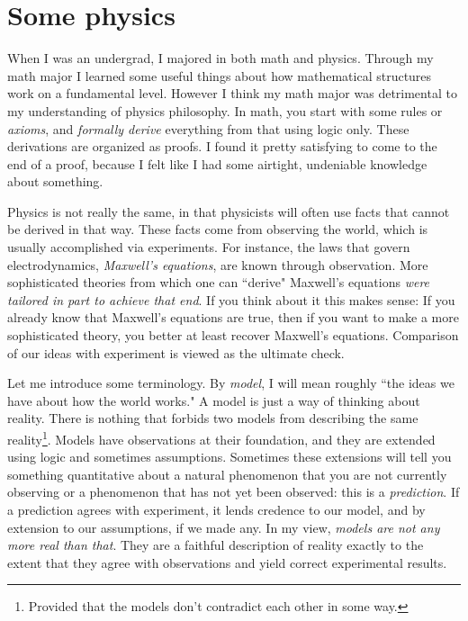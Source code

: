 \chapter{Some physics}\label{ch:physics}



When I was an undergrad, I majored in both math and physics. Through my math
major I learned some useful things about how mathematical structures work on a
fundamental level. However I think my math major was detrimental to my
understanding of physics philosophy. In math, you start with some rules or {\it
axioms}, and {\it formally derive} everything from that using logic only. 
These derivations are organized as proofs. I found it pretty satisfying to 
come to the end of a proof, because I felt like I had some airtight, undeniable 
knowledge about something. 

Physics is not really the same, in that physicists will often 
use facts that cannot be derived in that way. These facts come from
observing the world, which is usually accomplished via experiments.
For instance, the laws that govern electrodynamics, {\it Maxwell's equations},
are known through observation. More sophisticated theories from which one
can ``derive" Maxwell's equations {\it were tailored in part to achieve that
end}. If you think about it this makes sense: If you already know that Maxwell's
equations are true, then if you want to make a more sophisticated theory, you
better at least recover Maxwell's equations. 
Comparison of our ideas with experiment is viewed as the ultimate check.

Let me introduce some terminology. By {\it model}, I will mean roughly ``the
ideas we have about how the world works." A model is just a way of thinking
about reality. There is nothing that forbids two models from describing the same
reality\footnote{Provided that the models don't contradict each other in some
way.}. Models have observations at their foundation, and they are extended using
logic and sometimes assumptions. Sometimes these extensions will tell you
something quantitative about a natural phenomenon that you are not currently
observing or a phenomenon that has not yet been observed: this is a {\it
prediction}. If a prediction agrees with experiment, it lends credence to our
model, and by extension to our assumptions, if we made any.
In my view, {\it models are not any more real than that}. 
They are a faithful description of reality exactly to the extent that they 
agree with observations and yield correct experimental results.

